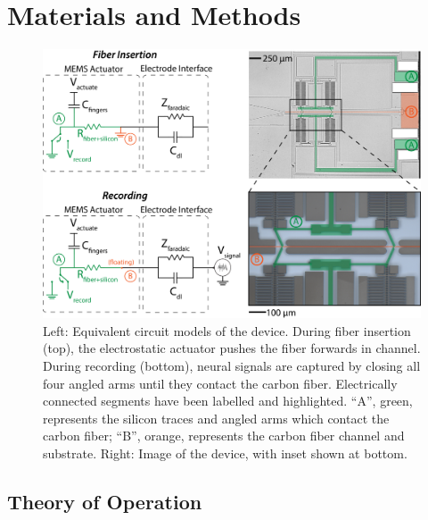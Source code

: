 \section{Materials and Methods}




\begin{figure}[]
    \centering
    \includegraphics[width=\columnwidth]{images/cartoon-2stages-dd.png}
    \caption{Left: Equivalent circuit models of the device. During fiber insertion (top), the electrostatic actuator pushes the fiber forwards in channel. During recording (bottom), neural signals are captured by closing all four angled arms until they contact the carbon fiber. Electrically connected segments have been labelled and highlighted. ``A'', green, represents the silicon traces and angled arms which contact the carbon fiber; ``B'', orange, represents the carbon fiber channel and substrate. Right: Image of the device, with inset shown at bottom.}
    \label{fig:cartoon-2states}
\end{figure}

\subsection{Theory of Operation}

